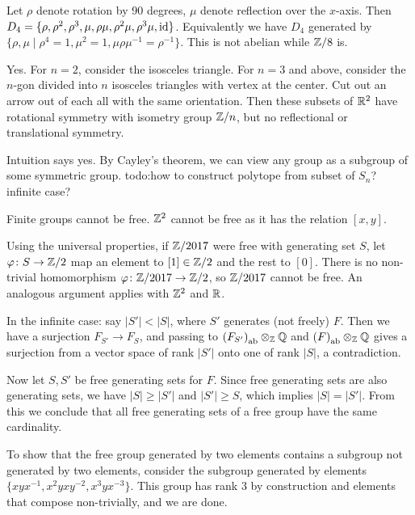\begin{ex}
    Let $\rho$ denote rotation by 90 degrees, $\mu$ denote reflection over the $x$-axis. Then $D_4 = \{\rho, \rho^2, \rho ^3,\mu,\rho\mu,\rho^2 \mu,\rho^3\mu,\operatorname{id}\} $. Equivalently we have $D_4$ generated by $\{\rho,\mu \mid \rho^4=1,\mu^2=1,\mu\rho\mu^{-1}=\rho ^{-1}\} $. This is not abelian while $\mathbb{Z}/8$ is.
\end{ex}
\begin{ex}
    Yes. For $n=2$, consider the isosceles triangle. For $n=3$ and above, consider the $n$-gon divided into $n$ isosceles triangles with vertex at the center. Cut out an arrow out of each all with the same orientation. Then these subsets of $\mathbb{R}^2$ have rotational symmetry with isometry group $\mathbb{Z} /n$, but no reflectional or translational symmetry. 
\end{ex}
\begin{ex} 
    Intuition says yes. By Cayley's theorem, we can view any group as a subgroup of some symmetric group. {\color{red}todo:how to construct polytope from subset of $S_n $? infinite case?} 
\end{ex}
\begin{ex}
    Finite groups cannot be free. $\mathbb{Z}^2$ cannot be free as it has the relation $[x,y]$.

    Using the universal properties, if $\mathbb{Z} /2017$ were free with generating set $S$, let $\varphi  \colon S \to \mathbb{Z} /2$ map an element to $[1] \in \mathbb{Z} /2$ and the rest to $[0]$. There is no non-trivial homomorphism $\varphi  \colon \mathbb{Z} /2017 \to \mathbb{Z} /2$, so $\mathbb{Z} /2017$ cannot be free. An analogous argument applies with $\mathbb{Z} ^2$ and $\mathbb{R}$.
\end{ex}
\begin{ex}
    In the infinite case: say $|S'| < |S|$, where $S'$ generates (not freely) $F$.  Then we have a surjection $F_{S'} \to F_S$, and passing to $\left(F_{S'}\right)_{\mathrm{ab}}\otimes _{\mathbb{Z}}\mathbb{Q}$ and $\left(F\right)_{\mathrm{ab}}\otimes _{\mathbb{Z}}\mathbb{Q}$ gives a surjection from a vector space of rank $|S'|$ onto one of rank $|S|$, a contradiction.
    
    Now let $S,S'$ be free generating sets for $F$. Since free generating sets are also generating sets, we have $|S| \geq |S'|$ and $|S'| \geq S$, which implies $|S|=|S'|$. From this we conclude that all free generating sets of a free group have the same cardinality. 

    To show that the free group generated by two elements contains a subgroup not generated by two elements, consider the subgroup generated by elements $\{xyx ^{-1}, x^2y xy^{-2}, x^3yx ^{-3}\} $. This group has rank 3 by construction and elements that compose non-trivially, and we are done.
\end{ex}
